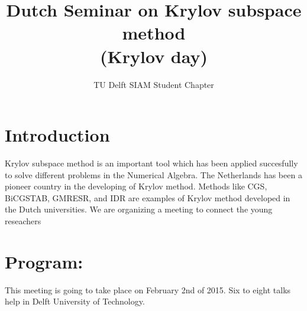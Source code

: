 \documentclass{article}
\title{Dutch Seminar on Krylov subspace method \\(Krylov day)}
\author{TU Delft SIAM Student Chapter}
\begin{document}
\maketitle
\section{Introduction}
Krylov subspace method is an important tool which has been applied succesfully to solve different problems 
in the Numerical Algebra. The Netherlands has been a pioneer country in the developing of Krylov method.
Methods like CGS, BiCGSTAB, GMRESR, and IDR  are examples of Krylov method developed in the Dutch universities. 
We are organizing a meeting to connect the young reseachers  
\newpage
\section{Program:}
This meeting is going to take place on February 2nd of 2015. Six to eight talks help in Delft University of Technology.
\end{document}
